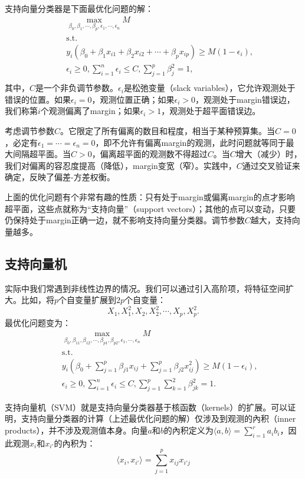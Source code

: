 \documentclass[hyperref,]{ctexart}
\begin{document}
支持向量分类器是下面最优化问题的解： \[
\begin{eqnarray}
&& \max_{\beta_0,\beta_1,\cdots,\beta_p,\epsilon_1,\cdots,\epsilon_n} M \\
&& \mathrm{s.t.} \\
&& y_i(\beta_0 + \beta_1 x_{i1}+\beta_2x_{i2}+\cdots+\beta_px_{ip})\geq M(1-\epsilon_i), \\
&& \epsilon_i \geq 0, \sum_{i=1}^n\epsilon_i \leq C, \sum_{j=1}^p \beta_j^2 =1, \\
\end{eqnarray}
\] 其中，\(C\)是一个非负调节参数。\(\epsilon_i\)是松弛变量（slack
variables），它允许观测处于错误的位置。如果\(\epsilon_i=0\)，观测位置正确；如果\(\epsilon_i>0\)，观测处于margin错误边，我们称第\(i\)个观测偏离了margin；如果\(\epsilon_i>1\)，观测处于超平面错误边。

考虑调节参数\(C\)。它限定了所有偏离的数目和程度，相当于某种预算集。当\(C=0\)，必定有\(\epsilon_1=\cdots=\epsilon_n=0\)，即不允许有偏离margin的观测，此时问题就等同于最大间隔超平面。当\(C>0\)，偏离超平面的观测数不得超过\(C\)。当\(C\)增大（减少）时，我们对偏离的容忍度提高（降低），margin变宽（窄）。实践中，\(C\)通过交叉验证来确定，反映了偏差-方差权衡。

上面的优化问题有个非常有趣的性质：只有处于margin或偏离margin的点才影响超平面，这些点就称为``支持向量''（support
vectors）；其他的点可以变动，只要仍保持处于margin正确一边，就不影响支持向量分类器。调节参数\(C\)越大，支持向量越多。

\subsection{支持向量机}\label{-1}

实际中我们常遇到非线性边界的情况。我们可以通过引入高阶项，将特征空间扩大。比如，将\(p\)个自变量扩展到\(2p\)个自变量：
\[X_1,X_1^2,X_2,X_2^2,\cdots,X_p,X_p^2.\] 最优化问题变为： \[
\begin{eqnarray}
&& \max_{\beta_0,\beta_{11},\beta_{12},\cdots,\beta_{p1},\beta_{p2},\epsilon_1,\cdots,\epsilon_n} M \\
&& \mathrm{s.t.} \\
&& y_i\left(\beta_0 +\sum_{j=1}^p\beta_{j1}x_{ij}+\sum_{j=1}^p\beta_{j2}x_{ij}^2 \right)\geq M(1-\epsilon_i), \\
&& \epsilon_i \geq 0, \sum_{i=1}^n\epsilon_i \leq C, \sum_{j=1}^p\sum_{k=1}^2\beta_{jk}^2 =1.
\end{eqnarray}
\]

支持向量机（SVM）就是支持向量分类器基于核函数（kernels）的扩展。可以证明，支持向量分类器的计算（上述最优化问题的解）仅涉及到观测的內积（inner
products），并不涉及观测值本身。向量\(a\)和\(b\)的內积定义为\(\langle a,b\rangle = \sum_{i=1}^r a_ib_i\)，因此观测\(x_i\)和\(x_{i'}\)的內积为：
\[\langle x_i,x_{i'}\rangle=\sum_{j=1}^p x_{ij}x_{i'j}\]
\end{document}
